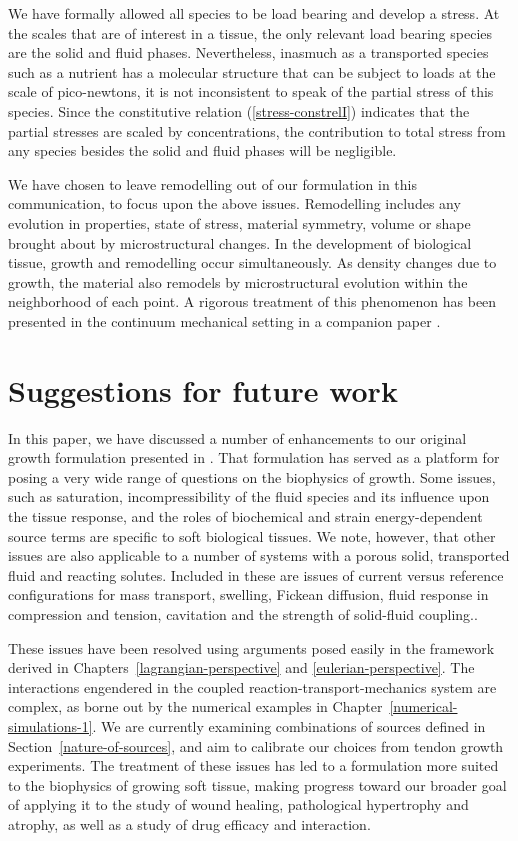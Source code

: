 We have formally allowed all species to be load bearing and
develop a stress. At the scales that are of interest in a tissue,
the only relevant load bearing species are the solid and fluid
phases. Nevertheless, inasmuch as a transported species such as a
nutrient has a molecular structure that can be subject to loads at
the scale of pico-newtons, it is not inconsistent to speak of the
partial stress of this species. Since the constitutive relation
(\ref{stress-constrelI}) indicates that the partial stresses are
scaled by concentrations, the contribution to total stress from
any species besides the solid and fluid phases will be negligible.

We have chosen to leave remodelling out of our formulation in this
communication, to focus upon the above issues. Remodelling
includes any evolution in properties, state of stress, material
symmetry, volume or shape brought about by microstructural
changes. In the development of biological tissue, growth and
remodelling occur simultaneously. As density changes due to
growth, the material also remodels by microstructural evolution
within the neighborhood of each point. A rigorous treatment of
this phenomenon has been presented in the continuum mechanical
setting in a companion paper \citep{remodelpaper}.

\section{Suggestions for future work}
\label{future-work}

In this paper, we have discussed a number of enhancements to our
original growth formulation presented in \citet{growthpaper}. That
formulation has served as a platform for posing a very wide range of
questions on the biophysics of growth. Some issues, such as
saturation, incompressibility of the fluid species and its influence
upon the tissue response, and the roles of biochemical and strain
energy-dependent source terms are specific to soft biological
tissues. We note, however, that other issues are also applicable to a
number of systems with a porous solid, transported fluid and reacting
solutes. Included in these are issues of current versus reference
configurations for mass transport, swelling, Fickean diffusion, fluid
response in compression and tension, cavitation and the strength of
solid-fluid coupling..

These issues have been resolved using arguments posed easily in the
framework derived in Chapters~\ref{lagrangian-perspective} and
\ref{eulerian-perspective}. The 
interactions engendered 
in the coupled reaction-trans\-port-mechanics system are complex, as
borne out by the numerical examples in
Chapter~\ref{numerical-simulations-1}. We are currently examining
combinations of sources defined in Section~\ref{nature-of-sources}, and aim to
calibrate our choices from tendon growth experiments. The treatment of
these issues has led to a formulation more suited to the biophysics of
growing soft tissue, making progress toward our broader goal of
applying it to the study of wound healing, pathological hypertrophy
and atrophy, as well as a study of drug efficacy and interaction.

